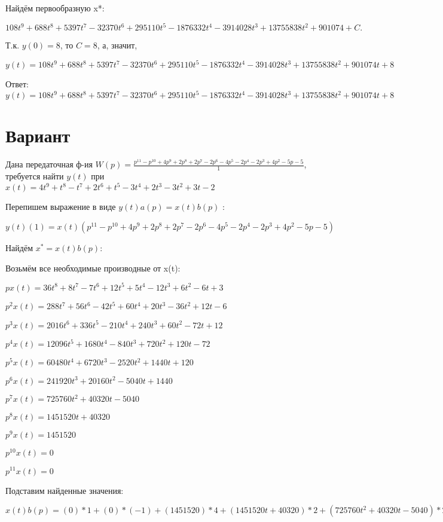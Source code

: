 \documentclass{article}
\begin{document}
{{Найдём первообразную x*:

$108t^{9}+688t^{8}+5397t^{7}-32370t^{6}+295110t^{5}-1876332t^{4}-3914028t^{3}+13755838t^{2}+901074+C.$

Т.к. $y(0)=8$, то $C=8$, а, значит, 

$y(t)=108t^{9}+688t^{8}+5397t^{7}-32370t^{6}+295110t^{5}-1876332t^{4}-3914028t^{3}+13755838t^{2}+901074t+8$

Ответ: $y(t) = 108t^{9}+688t^{8}+5397t^{7}-32370t^{6}+295110t^{5}-1876332t^{4}-3914028t^{3}+13755838t^{2}+901074t+8$

\section{Вариант}

Дана передаточная ф-ия $W(p)=\frac{p^{11}-p^{10}+4p^{9}+2p^{8}+2p^{7}-2p^{6}-4p^{5}-2p^{4}-2p^{3}+4p^{2}-5p-5}{1}$, требуется найти $y(t)$ при $x(t)=4t^{9}+t^{8}-t^{7}+2t^{6}+t^{5}-3t^{4}+2t^{3}-3t^{2}+3t-2$

Перепишем выражение в виде $y(t)a(p)=x(t)b(p)$ :

$y(t)(1)=x(t)(p^{11}-p^{10}+4p^{9}+2p^{8}+2p^{7}-2p^{6}-4p^{5}-2p^{4}-2p^{3}+4p^{2}-5p-5)$

Найдём $x^*=x(t)b(p)$:

Возьмём все необходимые производные от x(t):

$px(t)=36t^{8}+8t^{7}-7t^{6}+12t^{5}+5t^{4}-12t^{3}+6t^{2}-6t+3$

$p^2x(t)=288t^{7}+56t^{6}-42t^{5}+60t^{4}+20t^{3}-36t^{2}+12t-6$

$p^3x(t)=2016t^{6}+336t^{5}-210t^{4}+240t^{3}+60t^{2}-72t+12$

$p^4x(t)=12096t^{5}+1680t^{4}-840t^{3}+720t^{2}+120t-72$

$p^5x(t)=60480t^{4}+6720t^{3}-2520t^{2}+1440t+120$

$p^6x(t)=241920t^{3}+20160t^{2}-5040t+1440$

$p^7x(t)=725760t^{2}+40320t-5040$

$p^8x(t)=1451520t+40320$

$p^9x(t)=1451520$

$p^10x(t)=0$

$p^11x(t)=0$

Подставим найденные значения:

$x(t)b(p) = (0)*1+(0)*(-1)+(1451520)*4+(1451520t+40320)*2+(725760t^{2}+40320t-5040)*2+(241920t^{3}+20160t^{2}-5040t+1440)*(-2)+(60480t^{4}+6720t^{3}-2520t^{2}+1440t+120)*(-4)+(12096t^{5}+1680t^{4}-840t^{3}+720t^{2}+120t-72)*(-2)+(2016t^{6}+336t^{5}-210t^{4}+240t^{3}+60t^{2}-72t+12)*(-2)+(288t^{7}+56t^{6}-42t^{5}+60t^{4}+20t^{3}-36t^{2}+12t-6)*4+(36t^{8}+8t^{7}-7t^{6}+12t^{5}+5t^{4}-12t^{3}+6t^{2}-6t+3)*(-5)+(36t^{8}+8t^{7}-7t^{6}+12t^{5}+5t^{4}-12t^{3}+6t^{2}-6t+3)*(-5)=-360t^{8}+1072t^{7}-3738t^{6}-25152t^{5}-244670t^{4}-509320t^{3}+1419516t^{2}+2988012t$





}}
\end{document}
